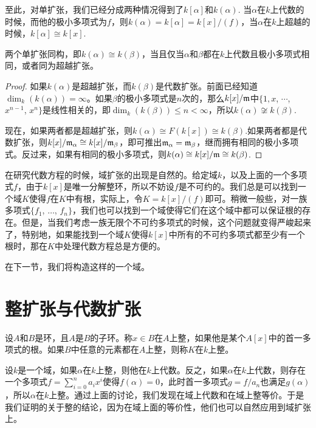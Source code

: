 至此，对单扩张，我们已经分成两种情况得到了$k[\alpha]$和$k(\alpha)$. 当$\alpha$在$k$上代数的时候，而他的极小多项式为$f$，则$k(\alpha)=k[\alpha]=k[x]/(f)$，当$\alpha$在$k$上超越的时候，$k[\alpha]\cong k[x]$.

\begin{pro}
两个单扩张同构，即$k(\alpha)\cong k(\beta)$，当且仅当$\alpha$和$\beta$都在$k$上代数且极小多项式相同，或者同为超越扩张。
\end{pro}

\begin{proof} 
	如果$k(\alpha)$是超越扩张，而$k(\beta)$是代数扩张。前面已经知道$\dim_k(k(\alpha))=\infty$。如果$\beta$的极小多项式是$n$次的，那么$k[x]/\mathfrak{m}$中$\{1,x$, $\cdots$, $x^{n-1}$, $x^n\}$是线性相关的，即$\dim_k(k(\beta))\leq n<\infty$，所以$k(\alpha)\not\cong k(\beta)$.

	现在，如果两者都是超越扩张，则$k(\alpha)\cong F(k[x])\cong k(\beta)$.如果两者都是代数扩张，则$k[x]/\mathfrak{m}_\alpha\cong k[x]/\mathfrak{m}_\beta$，即可推出$\mathfrak{m}_\alpha=\mathfrak{m}_\beta$，继而拥有相同的极小多项式。反过来，如果有相同的极小多项式，则$k(\alpha)\cong k[x]/\mathfrak{m}\cong k(\beta)$.
\end{proof}

\begin{para}
	在研究代数方程的时候，域扩张的出现是自然的。给定域$k$，以及上面的一个多项式$f$，由于$k[x]$是唯一分解整环，所以不妨设$f$是不可约的。我们总是可以找到一个域$K$使得$f$在$K$中有根，实际上，令$K=k[x]/(f)$即可。稍微一般些，对一族多项式$\{f_1$, $\dots$, $f_n\}$，我们也可以找到一个域使得它们在这个域中都可以保证根的存在。但是，当我们考虑一族无限个不可约多项式的时候，这个问题就变得严峻起来了，特别地，如果能找到一个域$K$使得$k[x]$中所有的不可约多项式都至少有一个根时，那在$K$中处理代数方程总是方便的。
\end{para}

在下一节，我们将构造这样的一个域。

\section{整扩张与代数扩张}

\para 设$A$和$B$是环，且$A$是$B$的子环。称$x\in B$在$A$上整，如果他是某个$A[x]$中的首一多项式的根。如果$B$中任意的元素都在$A$上整，则称$K$在$k$上整。

设$k$是一个域，如果$\alpha$在$k$上整，则他在$k$上代数。反之，如果$\alpha$在$k$上代数，则存在一个多项式$f=\sum_{i=0}^na_ix^i$使得$f(\alpha)=0$，此时首一多项式$g=f/a_n$也满足$g(\alpha)$，所以$\alpha$在$k$上整。通过上面的讨论，我们发现在域上代数和在域上整等价。于是我们证明的关于整的结论，因为在域上面的等价性，他们也可以自然应用到域扩张上。

